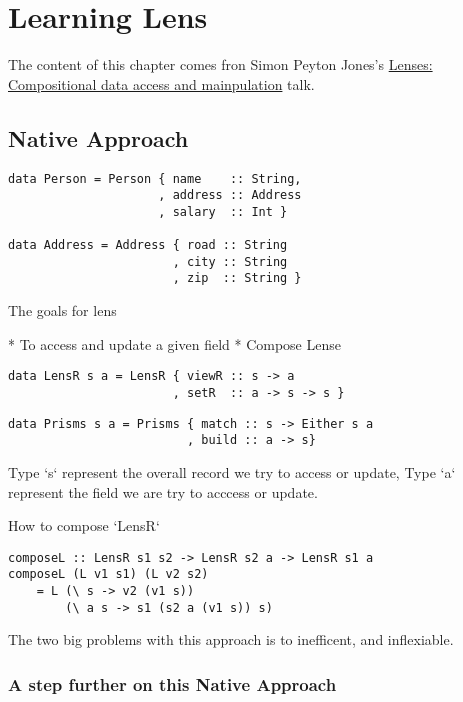 \chapter{Learning Lens}


The content of this chapter comes fron Simon Peyton Jones's \href{https://skillsmatter.com/skillscasts/4251-lenses-compositional-data-access-and-manipulation}{Lenses: Compositional data access and mainpulation} talk.

\section{Native Approach}

\begin{verbatim}
data Person = Person { name    :: String,
                     , address :: Address
                     , salary  :: Int }

data Address = Address { road :: String
                       , city :: String
                       , zip  :: String }
\end{verbatim}

The goals for lens

* To access and update a given field
* Compose Lense

\begin{verbatim}
data LensR s a = LensR { viewR :: s -> a
                       , setR  :: a -> s -> s }
\end{verbatim}

\begin{verbatim}
data Prisms s a = Prisms { match :: s -> Either s a
                         , build :: a -> s}
\end{verbatim}

Type `s` represent the overall record we try to access or update, Type `a` represent the field we are try to acccess or update.

How to compose `LensR`

\begin{verbatim}
composeL :: LensR s1 s2 -> LensR s2 a -> LensR s1 a
composeL (L v1 s1) (L v2 s2)
    = L (\ s -> v2 (v1 s))
        (\ a s -> s1 (s2 a (v1 s)) s)
\end{verbatim}

The two big problems with this approach is to inefficent, and inflexiable.

\subsection{A step further on this Native Approach}

